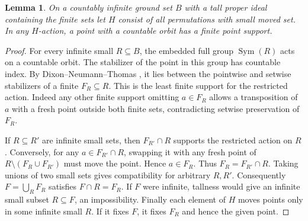 \documentclass[11pt]{article}
\newtheorem{lemma}[theorem]{Lemma}
\newcommand{\Sym}{\operatorname{Sym}}
\begin{document}
\begin{lemma}\label{row}
On a countably infinite ground set $B$ with a tall proper ideal containing the finite sets let $H$ consist of all permutations with small moved set. In any $H$-action, a point with a countable orbit has a finite point support.
\end{lemma}
\begin{proof}
For every infinite small $R\subseteq B$, the embedded full group $\Sym(R)$ acts on a countable orbit. The stabilizer of the point in this group has countable index. By Dixon--Neumann--Thomas \cite[Theorem~1]{dnt}, it lies between the pointwise and setwise stabilizers of a finite $F_R\subseteq R$. This is the least finite support for the restricted action. Indeed any other finite support omitting $a\in F_R$ allows a transposition of $a$ with a fresh point outside both finite sets, contradicting setwise preservation of $F_R$.

If $R\subseteq R'$ are infinite small sets, then $F_{R'}\cap R$ supports the restricted action on $R$. Conversely, for any $a\in F_{R'}\cap R$, swapping it with any fresh point of $R\setminus(F_R\cup F_{R'})$ must move the point. Hence $a\in F_R$. Thus $F_R=F_{R'}\cap R$. Taking unions of two small sets gives compatibility for arbitrary $R,R'$. Consequently $F=\bigcup_R F_R$ satisfies $F\cap R=F_R$. If $F$ were infinite, tallness would give an infinite small subset $R\subseteq F$, an impossibility. Finally each element of $H$ moves points only in some infinite small $R$. If it fixes $F$, it fixes $F_R$ and hence the given point.
\end{proof}
\end{document}
